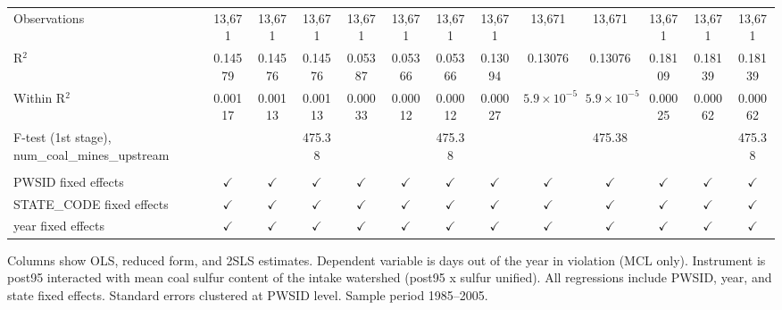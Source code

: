 \begin{table}[htbp]
\begin{adjustbox}{width = \textwidth, center}
\begin{tabular}{lcccccccccccc}
         Observations                                      & 13,671        & 13,671        & 13,671        & 13,671        & 13,671        & 13,671        & 13,671        & 13,671               & 13,671               & 13,671        & 13,671        & 13,671\\  
         R$^2$                                             & 0.14579       & 0.14576       & 0.14576       & 0.05387       & 0.05366       & 0.05366       & 0.13094       & 0.13076              & 0.13076              & 0.18109       & 0.18139       & 0.18139\\  
         Within R$^2$                                      & 0.00117       & 0.00113       & 0.00113       & 0.00033       & 0.00012       & 0.00012       & 0.00027       & $5.9\times 10^{-5}$  & $5.9\times 10^{-5}$  & 0.00025       & 0.00062       & 0.00062\\  
         F-test (1st stage), num\_coal\_mines\_upstream    &               &               & 475.38        &               &               & 475.38        &               &                      & 475.38               &               &               & 475.38\\  
         
          \\
         
         PWSID fixed effects                               & $\checkmark$  & $\checkmark$  & $\checkmark$  & $\checkmark$  & $\checkmark$  & $\checkmark$  & $\checkmark$  & $\checkmark$         & $\checkmark$         & $\checkmark$  & $\checkmark$  & $\checkmark$\\   
         STATE\_CODE fixed effects                         & $\checkmark$  & $\checkmark$  & $\checkmark$  & $\checkmark$  & $\checkmark$  & $\checkmark$  & $\checkmark$  & $\checkmark$         & $\checkmark$         & $\checkmark$  & $\checkmark$  & $\checkmark$\\   
         year fixed effects                                & $\checkmark$  & $\checkmark$  & $\checkmark$  & $\checkmark$  & $\checkmark$  & $\checkmark$  & $\checkmark$  & $\checkmark$         & $\checkmark$         & $\checkmark$  & $\checkmark$  & $\checkmark$\\   
         
         \bottomrule
         
      \end{tabular}
      
      
      
   \end{adjustbox}
      {\tiny\linespread{1}\selectfont \par \raggedright 
   Columns show OLS, reduced form, and 2SLS estimates. Dependent variable is days out of the year in violation (MCL only). Instrument is post95 interacted with mean coal sulfur content of the intake watershed (post95 x sulfur unified). All regressions include PWSID, year, and state fixed effects. Standard errors clustered at PWSID level. Sample period 1985--2005.}
   
\end{table}


